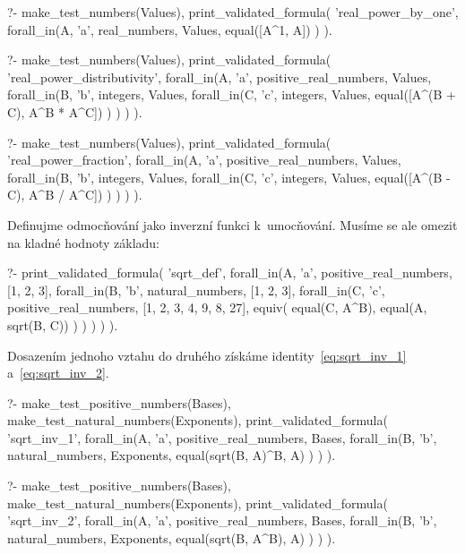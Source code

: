 \begin{fact}
\begin{prolog}
?-	make_test_numbers(Values),
	print_validated_formula(
		'real_power_by_one',
		forall_in(A, 'a', real_numbers, Values,
			equal([A^1, A])
		)
	).				
\end{prolog}
\begin{prolog}
?-	make_test_numbers(Values),
	print_validated_formula(
		'real_power_distributivity',
		forall_in(A, 'a', positive_real_numbers, Values,
			forall_in(B, 'b', integers, Values,
				forall_in(C, 'c', integers, Values,
					equal([A^(B + C), A^B * A^C])
				)
			)
		)
	).				
\end{prolog}
\end{fact}

\begin{prolog}
?-	make_test_numbers(Values),
	print_validated_formula(
		'real_power_fraction',
		forall_in(A, 'a', positive_real_numbers, Values,
			forall_in(B, 'b', integers, Values,
				forall_in(C, 'c', integers, Values,
					equal([A^(B - C), A^B / A^C])
				)
			)
		)
	).				
\end{prolog}

Definujme odmocňování jako inverzní funkci k~umocňování. Musíme se ale omezit na kladné hodnoty základu:

\begin{prolog}
?-	print_validated_formula(
		'sqrt_def',
		forall_in(A, 'a', positive_real_numbers, [1, 2, 3],
			forall_in(B, 'b', natural_numbers, [1, 2, 3],
				forall_in(C, 'c', positive_real_numbers, [1, 2, 3, 4, 9, 8, 27],
					equiv(
						equal(C, A^B),
						equal(A, sqrt(B, C))
					)
				)
			)
		)
	).				
\end{prolog}

Dosazením jednoho vztahu do druhého získáme identity~\eqref{eq:sqrt_inv_1} a~\eqref{eq:sqrt_inv_2}.

\begin{prolog}
?-	make_test_positive_numbers(Bases),
	make_test_natural_numbers(Exponents),
	print_validated_formula(
		'sqrt_inv_1',
		forall_in(A, 'a', positive_real_numbers, Bases,
			forall_in(B, 'b', natural_numbers, Exponents,
				equal(sqrt(B, A)^B, A)
			)
		)
	).				
\end{prolog}
\begin{prolog}
?-	make_test_positive_numbers(Bases),
	make_test_natural_numbers(Exponents),
	print_validated_formula(
		'sqrt_inv_2',
		forall_in(A, 'a', positive_real_numbers, Bases,
			forall_in(B, 'b', natural_numbers, Exponents,
				equal(sqrt(B, A^B), A)
			)
		)
	).				
\end{prolog}


